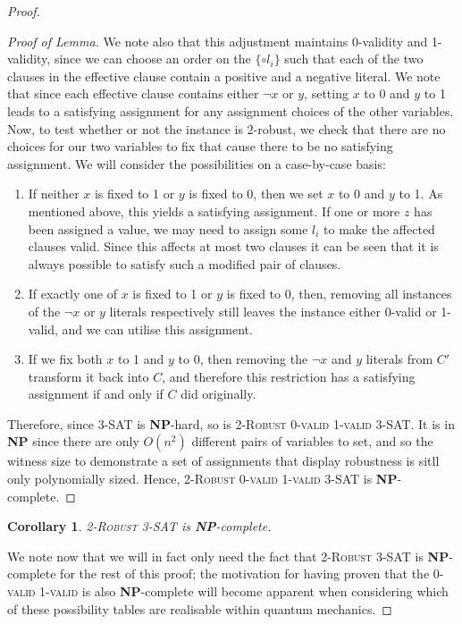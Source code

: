 \documentclass[reprint]{revtex4-1}
\newtheorem{cor}{Corollary}
\theoremstyle{definition}
\begin{document}
\begin{proof}
\begin{proof}[Proof of Lemma]
 We note also that this adjustment maintains 0-validity and 1-validity, since we can choose an order on the $\{\circ l_i\}$ such that each of the two clauses in the effective clause contain a positive and a negative literal. We note that since each effective clause contains either $\neg x$ or $y$, setting $x$ to 0 and $y$ to 1 leads to a satisfying assignment for any assignment choices of the other variables. Now, to test whether or not the instance is $2$-robust, we check that there are no choices for our two variables to fix that cause there to be no satisfying assignment. We will consider the possibilities on a case-by-case basis:
\begin{enumerate}
\item If neither $x$ is fixed to 1 or $y$ is fixed to 0, then we set $x$ to 0 and $y$ to 1. As mentioned above, this yields a satisfying assignment. If one or more $z$ has been assigned a value, we may need to assign some $l_i$ to make the affected clauses valid. Since this affects at most two clauses it can be seen that it is always possible to satisfy such a modified pair of clauses.

\item If exactly one of $x$ is fixed to 1 or $y$ is fixed to 0, then, removing all instances of the $\neg x$ or $y$ literals respectively still leaves the instance either 0-valid or 1-valid, and we can utilise this assignment.

\item If we fix both $x$ to 1 and $y$ to 0, then removing the $\neg x$ and $y$ literals from $C'$ transform it back into $C$, and therefore this restriction has a satisfying assignment if and only if $C$ did originally.
\end{enumerate}
Therefore, since \textsc{3-SAT} is \textbf{NP}-hard, so is \textsc{2-Robust 0-valid 1-valid 3-SAT}. It is in \textbf{NP} since there are only $O(n^2)$ different pairs of variables to set, and so the witness size to demonstrate a set of assignments that display robustness is sitll only polynomially sized.  Hence,  \textsc{2-Robust 0-valid 1-valid 3-SAT} is \textbf{NP}-complete.

\end{proof}
\begin{cor}
\textsc{2-Robust 3-SAT} is \textbf{NP}-complete.
\end{cor}
We note now that we will in fact only need the fact that \textsc{2-Robust 3-SAT} is \textbf{NP}-complete for the rest of this proof; the motivation for having proven that the \textsc{0-valid 1-valid} is also \textbf{NP}-complete will become apparent when considering which of these possibility tables are realisable within quantum mechanics.


\end{proof}
\end{document}
